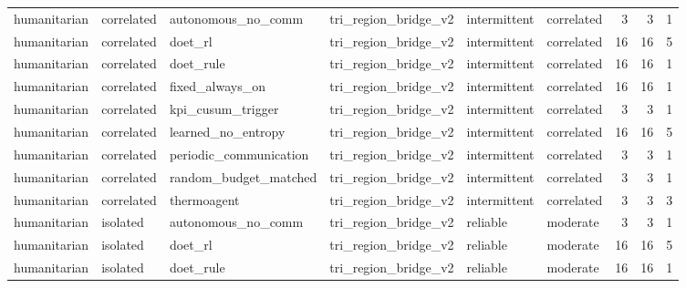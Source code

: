 \begin{table}
\begin{tabular}{llllllrrr}
humanitarian &              correlated &     autonomous\_no\_comm & tri\_region\_bridge\_v2 &  intermittent & correlated &         3 &                         3 &                         1 \\
humanitarian &              correlated &                doet\_rl & tri\_region\_bridge\_v2 &  intermittent & correlated &        16 &                        16 &                         5 \\
humanitarian &              correlated &              doet\_rule & tri\_region\_bridge\_v2 &  intermittent & correlated &        16 &                        16 &                         1 \\
humanitarian &              correlated &        fixed\_always\_on & tri\_region\_bridge\_v2 &  intermittent & correlated &        16 &                        16 &                         1 \\
humanitarian &              correlated &      kpi\_cusum\_trigger & tri\_region\_bridge\_v2 &  intermittent & correlated &         3 &                         3 &                         1 \\
humanitarian &              correlated &     learned\_no\_entropy & tri\_region\_bridge\_v2 &  intermittent & correlated &        16 &                        16 &                         5 \\
humanitarian &              correlated & periodic\_communication & tri\_region\_bridge\_v2 &  intermittent & correlated &         3 &                         3 &                         1 \\
humanitarian &              correlated &  random\_budget\_matched & tri\_region\_bridge\_v2 &  intermittent & correlated &         3 &                         3 &                         1 \\
humanitarian &              correlated &            thermoagent & tri\_region\_bridge\_v2 &  intermittent & correlated &         3 &                         3 &                         3 \\
humanitarian &                isolated &     autonomous\_no\_comm & tri\_region\_bridge\_v2 &      reliable &   moderate &         3 &                         3 &                         1 \\
humanitarian &                isolated &                doet\_rl & tri\_region\_bridge\_v2 &      reliable &   moderate &        16 &                        16 &                         5 \\
humanitarian &                isolated &              doet\_rule & tri\_region\_bridge\_v2 &      reliable &   moderate &        16 &                        16 &                         1 \\

\end{tabular}
\end{table}
